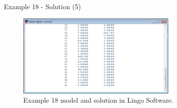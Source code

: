 \begin{frame}{Example 18 - Solution (5)}
\begin{figure}
    \includegraphics[width=300px]{slides/ex18/screenshot_e.png}
    \caption{Example 18 model and solution in Lingo Software.}
\end{figure}
\end{frame}



